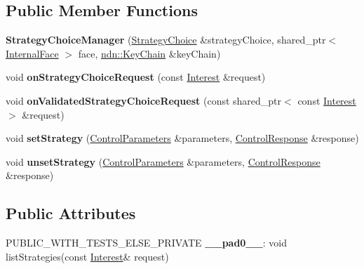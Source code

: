 \subsection*{Public Member Functions}
\begin{DoxyCompactItemize}
\item 
{\bfseries Strategy\+Choice\+Manager} (\hyperlink{classnfd_1_1StrategyChoice}{Strategy\+Choice} \&strategy\+Choice, shared\+\_\+ptr$<$ \hyperlink{classnfd_1_1InternalFace}{Internal\+Face} $>$ face, \hyperlink{classndn_1_1security_1_1KeyChain}{ndn\+::\+Key\+Chain} \&key\+Chain)\hypertarget{classnfd_1_1StrategyChoiceManager_a8a1f601543fc2efe249056b7fc26532c}{}\label{classnfd_1_1StrategyChoiceManager_a8a1f601543fc2efe249056b7fc26532c}

\item 
void {\bfseries on\+Strategy\+Choice\+Request} (const \hyperlink{classndn_1_1Interest}{Interest} \&request)\hypertarget{classnfd_1_1StrategyChoiceManager_adb249197d9f13f7ae15b8d4d6f541009}{}\label{classnfd_1_1StrategyChoiceManager_adb249197d9f13f7ae15b8d4d6f541009}

\item 
void {\bfseries on\+Validated\+Strategy\+Choice\+Request} (const shared\+\_\+ptr$<$ const \hyperlink{classndn_1_1Interest}{Interest} $>$ \&request)\hypertarget{classnfd_1_1StrategyChoiceManager_a74a1631ec6a73418c3399866be85040a}{}\label{classnfd_1_1StrategyChoiceManager_a74a1631ec6a73418c3399866be85040a}

\item 
void {\bfseries set\+Strategy} (\hyperlink{classndn_1_1nfd_1_1ControlParameters}{Control\+Parameters} \&parameters, \hyperlink{classndn_1_1mgmt_1_1ControlResponse}{Control\+Response} \&response)\hypertarget{classnfd_1_1StrategyChoiceManager_a25a84413484899522b4d046617a2d54f}{}\label{classnfd_1_1StrategyChoiceManager_a25a84413484899522b4d046617a2d54f}

\item 
void {\bfseries unset\+Strategy} (\hyperlink{classndn_1_1nfd_1_1ControlParameters}{Control\+Parameters} \&parameters, \hyperlink{classndn_1_1mgmt_1_1ControlResponse}{Control\+Response} \&response)\hypertarget{classnfd_1_1StrategyChoiceManager_af8c97f8a2dc47fbd3e00bb2a2f008f11}{}\label{classnfd_1_1StrategyChoiceManager_af8c97f8a2dc47fbd3e00bb2a2f008f11}

\end{DoxyCompactItemize}
\subsection*{Public Attributes}
\begin{DoxyCompactItemize}
\item 
P\+U\+B\+L\+I\+C\+\_\+\+W\+I\+T\+H\+\_\+\+T\+E\+S\+T\+S\+\_\+\+E\+L\+S\+E\+\_\+\+P\+R\+I\+V\+A\+TE {\bfseries \+\_\+\+\_\+pad0\+\_\+\+\_\+}\+: void list\+Strategies(const \hyperlink{classndn_1_1Interest}{Interest}\& request)\hypertarget{classnfd_1_1StrategyChoiceManager_a9291ac630b901eb548e1d39013a0eaab}{}\label{classnfd_1_1StrategyChoiceManager_a9291ac630b901eb548e1d39013a0eaab}

\end{DoxyCompactItemize}
